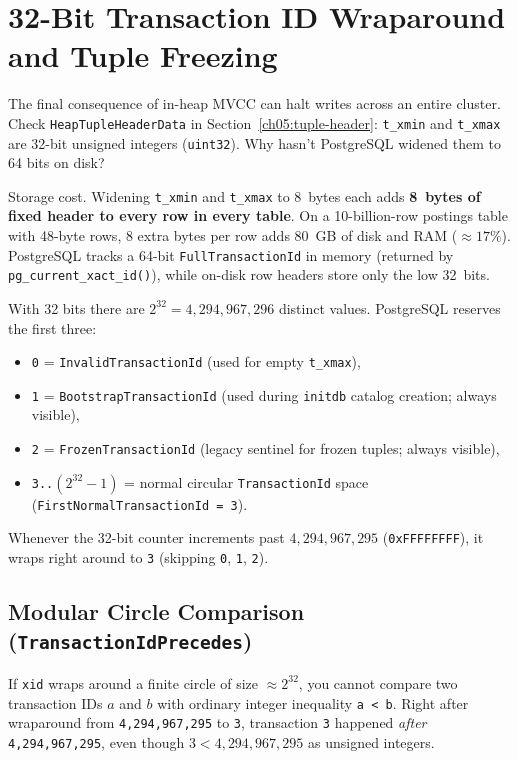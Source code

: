 \section{32-Bit Transaction ID Wraparound and Tuple Freezing}
\label{ch05:xid-wraparound}

The final consequence of in-heap MVCC can halt writes across an entire cluster. Check \texttt{HeapTupleHeaderData} in Section~\ref{ch05:tuple-header}: \texttt{t\_xmin} and \texttt{t\_xmax} are 32-bit unsigned integers (\texttt{uint32}). Why hasn't PostgreSQL widened them to 64 bits on disk?

Storage cost. Widening \texttt{t\_xmin} and \texttt{t\_xmax} to 8~bytes each adds \textbf{8~bytes of fixed header to every row in every table}. On a 10-billion-row postings table with 48-byte rows, 8 extra bytes per row adds 80~GB of disk and RAM ($\approx 17\%$). PostgreSQL tracks a 64-bit \texttt{FullTransactionId} in memory (returned by \texttt{pg\_current\_xact\_id()}), while on-disk row headers store only the low 32~bits.

With 32 bits there are $2^{32} = 4{,}294{,}967{,}296$ distinct values. PostgreSQL reserves the first three:
\begin{itemize}
  \item \texttt{0} = \texttt{InvalidTransactionId} (used for empty \texttt{t\_xmax}),
  \item \texttt{1} = \texttt{BootstrapTransactionId} (used during \texttt{initdb} catalog creation; always visible),
  \item \texttt{2} = \texttt{FrozenTransactionId} (legacy sentinel for frozen tuples; always visible),
  \item \texttt{3..}$(2^{32}-1)$ = normal circular \texttt{TransactionId} space (\texttt{FirstNormalTransactionId = 3}).
\end{itemize}
Whenever the 32-bit counter increments past $4{,}294{,}967{,}295$ (\texttt{0xFFFFFFFF}), it wraps right around to \texttt{3} (skipping \texttt{0}, \texttt{1}, \texttt{2}).

\subsection{Modular Circle Comparison (\texttt{TransactionIdPrecedes})}

If \texttt{xid} wraps around a finite circle of size $\approx 2^{32}$, you cannot compare two transaction IDs $a$ and $b$ with ordinary integer inequality \texttt{a < b}. Right after wraparound from \texttt{4,294,967,295} to \texttt{3}, transaction \texttt{3} happened \emph{after} \texttt{4,294,967,295}, even though $3 < 4{,}294{,}967{,}295$ as unsigned integers.

